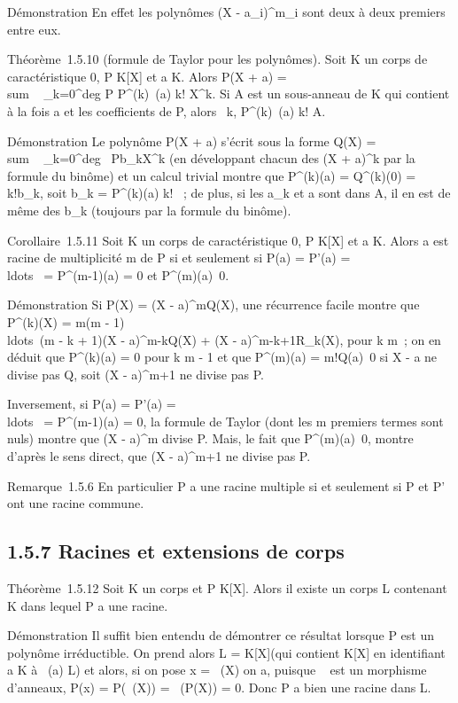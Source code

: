 Démonstration En effet les polynômes (X -
a_i)^m_i sont deux à deux premiers entre eux.

Théorème~1.5.10 (formule de Taylor pour les polynômes). Soit K un corps
de caractéristique 0, P \in K[X] et a \in K. Alors P(X + a)
= \\sum ~
_k=0^deg P P^(k)~(a)
\over k! X^k. Si A est un sous-anneau de K
qui contient à la fois a et les coefficients de P, alors
\forall~k, P^(k)~(a) \over
k! \in A.

Démonstration Le polynôme P(X + a) s'écrit sous la forme Q(X)
= \\sum ~
_k=0^deg~
Pb_kX^k (en développant chacun des (X +
a)^k par la formule du binôme) et un calcul trivial montre que
P^(k)(a) = Q^(k)(0) = k!b_k, soit
b_k = P^(k)(a) \over k! ~; de
plus, si les a_k et a sont dans A, il en est de même des
b_k (toujours par la formule du binôme).

Corollaire~1.5.11 Soit K un corps de caractéristique 0, P \in K[X] et
a \in K. Alors a est racine de multiplicité m de P si et seulement si P(a)
= P'(a) = \\ldots~ =
P^(m-1)(a) = 0 et
P^(m)(a)\neq~0.

Démonstration Si P(X) = (X - a)^mQ(X), une récurrence facile
montre que P^(k)(X) = m(m -
1)\\ldots~(m - k +
1)(X - a)^m-kQ(X) + (X - a)^m-k+1R_k(X),
pour k \leq m~; on en déduit que P^(k)(a) = 0 pour k \leq m - 1 et
que P^(m)(a) = m!Q(a)\neq~0 si X - a
ne divise pas Q, soit (X - a)^m+1 ne divise pas P.

Inversement, si P(a) = P'(a) =
\\ldots~ =
P^(m-1)(a) = 0, la formule de Taylor (dont les m premiers
termes sont nuls) montre que (X - a)^m divise P. Mais, le
fait que P^(m)(a)\neq~0, montre
d'après le sens direct, que (X - a)^m+1 ne divise pas P.

Remarque~1.5.6 En particulier P a une racine multiple si et seulement si
P et P' ont une racine commune.

\subsection{1.5.7 Racines et extensions de corps}

Théorème~1.5.12 Soit K un corps et P \in K[X]. Alors il existe un
corps L contenant K dans lequel P a une racine.

Démonstration Il suffit bien entendu de démontrer ce résultat lorsque P
est un polynôme irréductible. On prend alors L = K[X]\diagupPK[X] (qui
contient K[X] en identifiant a \in K à \pi~(a) \in L) et alors, si on pose
x = \pi~(X) on a, puisque \pi~ est un morphisme d'anneaux, P(x) = P(\pi~(X)) =
\pi~(P(X)) = 0. Donc P a bien une racine dans L.

